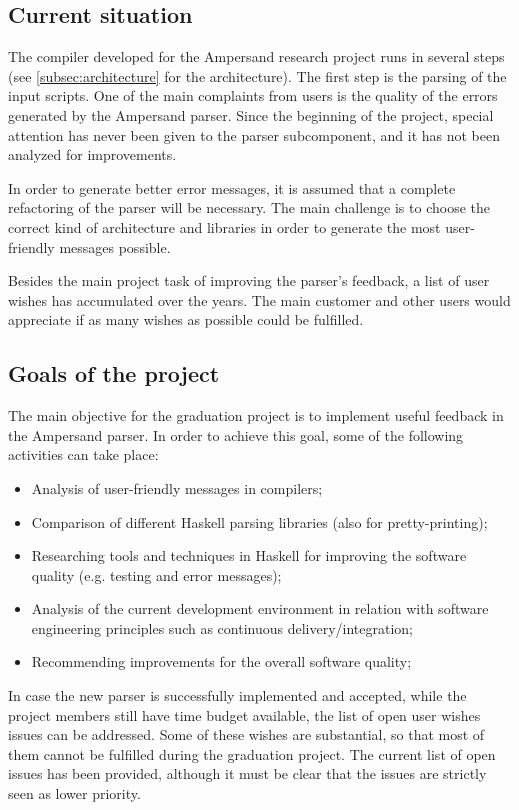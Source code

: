 \subsection{Current situation}
The compiler developed for the Ampersand research project runs in several steps (see \autoref{subsec:architecture} for the architecture).
The first step is the parsing of the input scripts.
One of the main complaints from users is the quality of the errors generated by the Ampersand parser.
Since the beginning of the project, special attention has never been given to the parser subcomponent, and it has not been analyzed for improvements.

In order to generate better error messages, it is assumed that a complete refactoring of the parser will be necessary.
The main challenge is to choose the correct kind of architecture and libraries in order to generate the most user-friendly messages possible.

Besides the main project task of improving the parser's feedback, a list of user wishes has accumulated over the years.
The main customer and other users would appreciate if as many wishes as possible could be fulfilled.

\subsection{Goals of the project}
\label{subsec:project-goals}
The main objective for the graduation project is to implement useful feedback in the Ampersand parser.
In order to achieve this goal, some of the following activities can take place:
\begin{itemize}
	\item Analysis of user-friendly messages in compilers;
	\item Comparison of different Haskell parsing libraries (also for pretty-printing);
	\item Researching tools and techniques in Haskell for improving the software quality (e.g. testing and error messages);
	\item Analysis of the current development environment in relation with software engineering principles such as continuous delivery/integration;
	\item Recommending improvements for the overall software quality;
\end{itemize}
%
In case the new parser is successfully implemented and accepted, while the project members still have time budget available, the list of open user wishes issues can be addressed.
Some of these wishes are substantial, so that most of them cannot be fulfilled during the graduation project.
The current list of open issues has been provided\cite{open-issues}, although it must be clear that the issues are strictly seen as lower priority.


